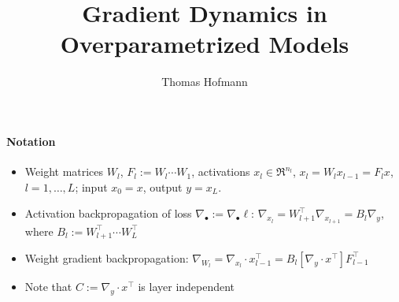 \documentclass{article}
\author{Thomas Hofmann}
\title{Gradient Dynamics in Overparametrized Models}
\begin{document}
\maketitle 

\paragraph{Notation}
\begin{itemize}
\item Weight matrices $W_l$, $F_l := W_l \cdots W_1$, activations $x_l \in \Re^{n_l}$, $x_l = W_l x_{l-1} = F_l x$, $l = 1,\dots, L$; input $x_0 =x$, output $y = x_L$.
\item Activation backpropagation of loss $\nabla_\bullet := \nabla_\bullet \ell$: $\nabla_{x_l}  = W_{l+1}^\top \nabla_{x_{l+1}}  = B_{l} \nabla_y$, where $B_l := W_{l+1}^\top \cdots W_{L}^\top$
\item Weight gradient backpropagation: $\nabla_{W_l}  = \nabla_{x_{l}}  \cdot  x_{l-1}^\top  = B_{l} \left[ \nabla_y \cdot x^\top \right]F_{l-1}^\top$
\item Note that $C := \nabla_y \cdot x^\top $ is layer independent 
\end{itemize}
\end{document}
